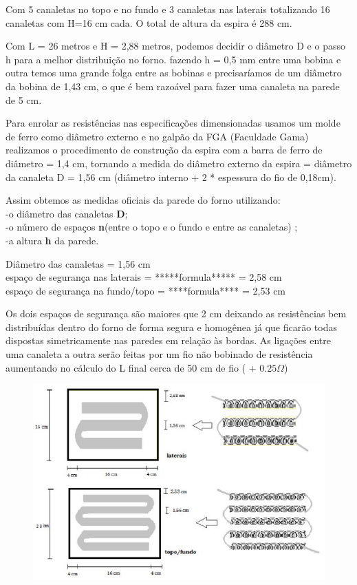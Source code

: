 Com 5 canaletas no topo e no fundo e 3 canaletas nas laterais totalizando 16 canaletas com H=16 cm cada. O total de altura da espira é 288 cm.


Com L = 26 metros e H = 2,88 metros, podemos decidir o diâmetro D e o passo h para a melhor distribuição no forno. fazendo h = 0,5 mm entre uma bobina e outra temos uma grande folga entre as bobinas e precisaríamos de um diâmetro da bobina de 1,43 cm, o que é bem razoável para fazer uma canaleta na parede de 5 cm.


Para enrolar as resistências nas especificações dimensionadas usamos um molde de ferro como diâmetro externo e no galpão da FGA (Faculdade Gama) realizamos o procedimento de construção da espira com a barra de ferro de diâmetro = 1,4 cm, tornando a medida do diâmetro externo da espira = diâmetro da canaleta D = 1,56 cm (diâmetro interno + 2 * espessura do fio de 0,18cm). 


Assim obtemos as medidas oficiais da parede do forno utilizando:
\\-o diâmetro das canaletas \textbf{D}; 
\\-o número de espaços \textbf{n}(entre o topo e o fundo e entre as canaletas) ; 
\\-a altura \textbf{h} da parede.

Diâmetro das canaletas = 1,56 cm
\\espaço de segurança nas laterais = *****formula***** = 2,58 cm
\\espaço de segurança na fundo/topo = ****formula**** = 2,53 cm

Os dois espaços de segurança são maiores que 2 cm deixando as resistências bem distribuídas dentro do forno de forma segura e homogênea já que ficarão todas dispostas simetricamente nas paredes em relação às bordas.
As ligações entre uma canaleta a outra serão feitas por um fio não bobinado de resistência aumentando no cálculo do L final cerca de 50 cm de fio ( + $0.25\Omega$)

\begin{figure}[H]
	\centering
	\label{resistencia3}
	\includegraphics[keepaspectratio=true,scale=1.0]{figuras/alimentacao5.JPG}
\end{figure}

